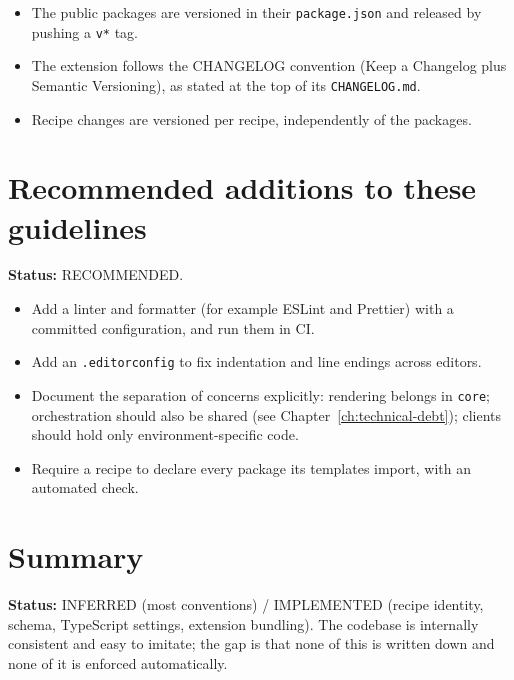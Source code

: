 \begin{itemize}
  \item The public packages are versioned in their \texttt{package.json} and
        released by pushing a \texttt{v*} tag.
  \item The extension follows the CHANGELOG convention (Keep a Changelog plus
        Semantic Versioning), as stated at the top of its \texttt{CHANGELOG.md}.
  \item Recipe changes are versioned per recipe, independently of the packages.
\end{itemize}

\section{Recommended additions to these guidelines}

\textbf{Status:} RECOMMENDED.

\begin{itemize}
  \item Add a linter and formatter (for example ESLint and Prettier) with a
        committed configuration, and run them in CI.
  \item Add an \texttt{.editorconfig} to fix indentation and line endings across
        editors.
  \item Document the separation of concerns explicitly: rendering belongs in
        \texttt{core}; orchestration should also be shared (see
        Chapter~\ref{ch:technical-debt}); clients should hold only
        environment-specific code.
  \item Require a recipe to declare every package its templates import, with an
        automated check.
\end{itemize}

\section{Summary}

\textbf{Status:} INFERRED (most conventions) / IMPLEMENTED (recipe identity,
schema, TypeScript settings, extension bundling). The codebase is internally
consistent and easy to imitate; the gap is that none of this is written down and
none of it is enforced automatically.
